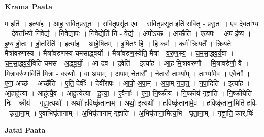 \documentclass[17pt]{extarticle}
\begin{document}
\textbf{Krama Paata} \newline

म॒ इति॑ । इत्या॑ह । आ॒ह॒ स॒वि॒तृप्र॑सूतः । स॒वि॒तृप्रसू॑त ए॒व । स॒वि॒तृप्र॑सूत॒ इति॑ सवि॒तृ - प्र॒सू॒तः॒ । ए॒व दे॒वता᳚भ्यः । दे॒वता᳚भ्यो नि॒वेद्य॑ । नि॒वेद्या॒पः । नि॒वेद्येति॑ नि - वेद्य॑ । अ॒पोऽच्छ॑ । अच्छै॑ति । ए॒त्य॒पः । अ॒प इ॑ष्य । इ॒ष्य॒ हो॒तः॒ । हो॒त॒रिति॑ । इत्या॑ह । आ॒हे॒षि॒तम् । इ॒षि॒तꣳ हि । हि कर्म॑ । कर्म॑ क्रि॒यते᳚ । क्रि॒यते॒ मैत्रा॑वरुणस्य । मैत्रा॑वरुणस्य चमसाद्ध्वर्यो । मैत्रा॑वरुण॒स्येति॒ मैत्रा᳚ - व॒रु॒ण॒स्य॒ । च॒म॒सा॒द्ध्व॒र्य॒वा । च॒म॒सा॒द्ध्व॒र्य॒विति॑ चमस - अ॒द्ध्व॒र्यो॒ । आ द्र॑व । द्र॒वेति॑ । इत्या॑ह । आ॒ह॒ मि॒त्रावरु॑णौ । मि॒त्रावरु॑णौ॒ वै । मि॒त्रावरु॑णा॒विति॑ मि॒त्रा - वरु॑णौ । वा अ॒पाम् । अ॒पाम् ने॒तारौ᳚ । ने॒तारौ॒ ताभ्या᳚म् । ताभ्या॑मे॒व । ए॒वैनाः᳚ । ए॒ना॒ अच्छ॑ । अच्छै॑ति । ए॒ति॒ देवीः᳚ । देवी॑रापः । आ॒पो॒ अ॒पा॒म् । अ॒पा॒म् न॒पा॒त्॒ । न॒पा॒दिति॑ । इत्या॑ह । आ॒हाहु॑त्या । आहु॑त्यै॒व । आहु॒त्येत्या - हु॒त्या॒ । ए॒वैनाः᳚ । ए॒ना॒ नि॒ष्क्रीय॑ । नि॒ष्क्रीय॑ गृह्णाति । नि॒ष्क्रीयेति॑ निः - क्रीय॑ । गृ॒ह्णा॒त्यथो᳚ । अथो॑ ह॒विष्कृ॑तानाम् । अथो॒ इत्यथो᳚ । ह॒विष्कृ॑तानामे॒व । ह॒विष्कृ॑ताना॒मिति॑ ह॒विः - कृ॒ता॒ना॒म् । ए॒वाभिघृ॑तानाम् । अ॒भिघृ॑तानाम् गृह्णाति । अ॒भिघृ॑ताना॒मित्य॒भि - घृ॒ता॒ना॒म् । गृ॒ह्णा॒ति॒ कार्.षिः॑ \newline

\textbf{Jatai Paata} \newline
\end{document}
